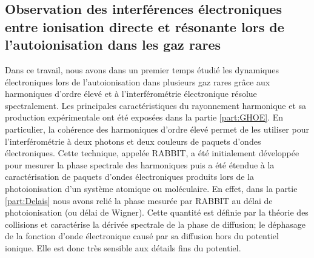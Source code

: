 \cleardoublepage
\renewcommand{\thesection}{\Roman{section}}
\setcounter{section}{0}
\renewcommand{\theHsection}{CL.\the\value{section}}
\renewcommand{\thefigure}{\Roman{section}.\arabic{figure}}
\renewcommand{\theHfigure}{CL.\Roman{section}.\arabic{figure}}
\setcounter{figure}{0}

\makeatletter
\def\toclevel@chapter{-1}
\def\toclevel@section{0}
\def\toclevel@subsection{1}
\makeatother


\subsection*{Observation des interférences électroniques entre ionisation directe et résonante lors de l'autoionisation dans les gaz rares}
Dans ce travail, nous avons dans un premier temps étudié les dynamiques électroniques lors de l'autoionisation dans plusieurs gaz rares grâce aux harmoniques d'ordre élevé et à l'interférométrie électronique résolue spectralement. Les principales caractéristiques du rayonnement harmonique et sa production expérimentale ont été exposées dans la partie \ref{part:GHOE}. En particulier, la cohérence des harmoniques d'ordre élevé permet de les utiliser pour l'interférométrie à deux photons et deux couleurs de paquets d'ondes électroniques. Cette technique, appelée RABBIT, a été initialement développée pour mesurer la phase spectrale des harmoniques puis a été étendue à la caractérisation de paquets d'ondes électroniques produits lors de la photoionisation d'un système atomique ou moléculaire. En effet, dans la partie \ref{part:Delais} nous avons relié la phase mesurée par RABBIT au délai de photoionisation (ou délai de Wigner). Cette quantité est définie par la théorie des collisions et caractérise la dérivée spectrale de la phase de diffusion; le déphasage de la fonction d'onde électronique causé par sa diffusion hors du potentiel ionique. Elle est donc très sensible aux détails fins du potentiel.

